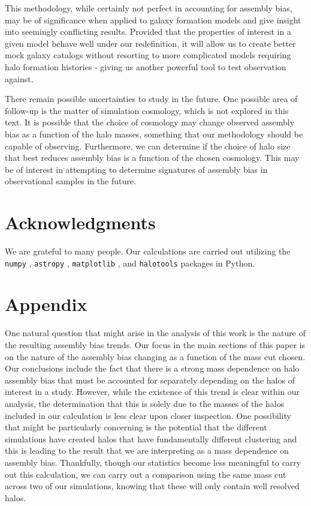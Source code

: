 \documentclass[usenatbib]{mnras}
\begin{document}
This methodology, while certainly not perfect in accounting for assembly bias, may be of significance when
applied to galaxy formation models and give insight into seemingly conflicting results. Provided that the
properties of interest in a given model behave well under our redefinition, it will allow us to create better
mock galaxy catalogs without resorting to more complicated models requiring halo formation histories - giving us
another powerful tool to test observation against.

There remain possible uncertainties to study in the future. One possible area of follow-up is the matter of
simulation cosmology, which is not explored in this text. It is possible that the choice of cosmology may change
observed assembly bias as a function of the halo masses, something that our methodology should be capable of
observing. Furthermore, we can determine if the choice of halo size that best reduces assembly bias is a function
of the chosen cosmology. This may be of interest in attempting to determine signatures of assembly bias in
observational samples in the future.

\section*{Acknowledgments}

We are grateful to many people. Our calculations are carried out utilizing the
{\tt numpy} \citep{numpy}, {\tt astropy} \citep{astropy}, {\tt matplotlib} 
\citep{matplotlib}, and {\tt halotools} \citep{halotools} packages in Python.



\section*{Appendix}
\label{section:appendix_massres}

One natural question that might arise in the analysis of this work is the nature of the resulting assembly bias
trends. Our focus in the main sections of this paper is on the nature of the assembly bias changing as a function
of the mass cut chosen. Our conclusions include the fact that there is a strong mass dependence on halo assembly
bias that must be accounted for separately depending on the halos of interest in a study. However, while the
existence of this trend is clear within our analysis, the determination that this is solely due to the masses of
the halos included in our calculation is less clear upon closer inspection. One possibility that might be
particularly concerning is the potential that the different simulations have created halos that have
fundamentally different clustering and this is leading to the result that we are interpreting as a mass
dependence on assembly bias. Thankfully, though our statistics become less meaningful to carry out this
calculation, we can carry out a comparison using the same mass cut across two of our simulations, knowing that
these will only contain well resolved halos.
\end{document}
